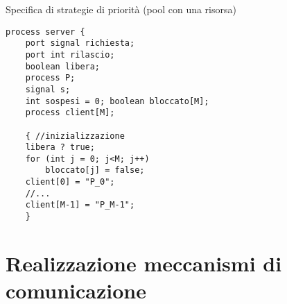Specifica di strategie di priorità (pool con una risorsa)
\begin{verbatim}
process server {
    port signal richiesta;
    port int rilascio;
    boolean libera;
    process P;
    signal s;
    int sospesi = 0; boolean bloccato[M];
    process client[M];

    { //inizializzazione
    libera ? true;
    for (int j = 0; j<M; j++)
        bloccato[j] = false;
    client[0] = "P_0"; 
    //...
    client[M-1] = "P_M-1";
    }
\end{verbatim}













































\section{Realizzazione meccanismi di comunicazione}

























